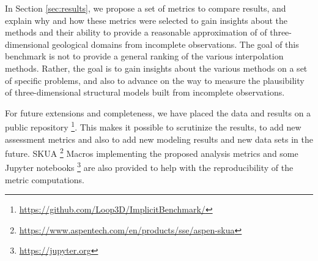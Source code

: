 \documentclass[preprint]{ring20}
\begin{document}
In Section \ref{sec:results}, we propose a set of metrics to compare results, and explain why and how these metrics were selected to gain insights about the methods and their ability to provide a reasonable approximation of of three-dimensional geological domains from incomplete observations. The goal of this benchmark is not to provide a general ranking of the various interpolation methods. Rather, the goal is to gain insights about the various methods on a set of specific problems, and also to advance on the way to measure the plausibility of three-dimensional structural models built from incomplete observations. %

For future extensions and completeness, we have placed the data and results on a public repository \footnote{\url{https://github.com/Loop3D/ImplicitBenchmark/}}. This makes it possible to scrutinize the results, to add new assessment metrics and also to add new modeling results and new data sets in the future. SKUA \footnote{\url{https://www.aspentech.com/en/products/sse/aspen-skua}} Macros implementing the proposed analysis metrics and some Jupyter notebooks \footnote{\url{https://jupyter.org}} are also provided to help with the reproducibility of the metric computations. 
\end{document}
